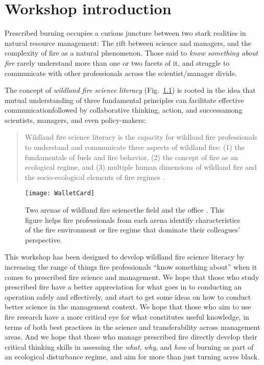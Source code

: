 \chapter{Workshop introduction} 

Prescribed burning occupies a curious juncture between two stark realities in natural resource management: The rift between science and managers, and the complexity of fire as a natural phenomenon. 
Those said to \emph{know something about fire} rarely understand more than one or two facets of it, and struggle to communicate with other professionals across the scientist/manager divide. 

The concept of \emph{wildland fire science literacy} (Fig.~\ref{fig:WalletCard}) is rooted in the idea that  mutual understanding of three fundamental principles can facilitate effective communication\textemdash followed by collaborative thinking, action, and success\textemdash among scientists, managers, and even policy-makers:

\begin{quote}
	Wildland fire science literacy is the capacity for wildland fire professionals to understand and communicate three aspects of wildland fire: (1) the fundamentals of fuels and fire behavior, (2) the concept of fire as an ecological regime, and (3) multiple human dimensions of wildland fire and the socio-ecological elements of fire regimes \citep{mcgranahan2018}.
\end{quote}  

\begin{figure}
	\begin{center}
		\texttt{[image: WalletCard]}
	\end{center}
	\caption{Two arenas of wildland fire science\textemdash the field and the office \citep{mcgranahan2018}. 
	This figure helps fire professionals from each arena identify characteristics of the fire environment or fire regime that dominate their colleagues' perspective.  
	\label{fig:WalletCard} }  %
\end{figure}

This workshop has been designed to develop wildland fire science literacy by increasing the range of things fire professionals ``know something about'' when it comes to prescribed fire science and management. 
We hope that those who study prescribed fire have a better appreciation for what goes in to conducting an operation safely and effectively, and start to get some ideas on how to conduct better science in the management context.  
We hope that those who aim to use fire research have a more critical eye for what constitutes useful knowledge, in terms of both best practices in the science and transferability across management areas. 
And we hope that those who manage prescribed fire directly develop their critical thinking skills in assessing the \emph{what}, \emph{why}, and \emph{how} of burning as part of an ecological disturbance regime, and aim for more than just turning acres black. 

